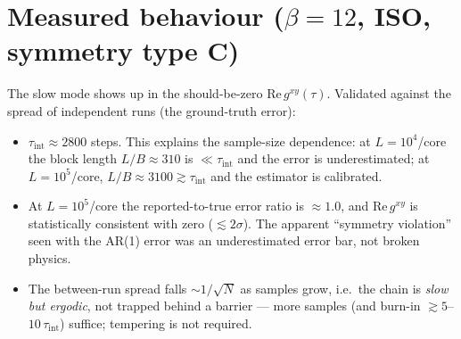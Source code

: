 \documentclass[11pt]{article}
\newcommand{\tauint}{\tau_{\mathrm{int}}}
\begin{document}
\section{Measured behaviour ($\beta=12$, ISO, symmetry type C)}
\label{sec:numbers}

The slow mode shows up in the should-be-zero $\mathrm{Re}\,g^{xy}(\tau)$. Validated
against the spread of independent runs (the ground-truth error):
\begin{itemize}
  \item $\tauint \approx 2800$ steps. This explains the sample-size dependence: at
        $L=10^4$/core the block length $L/B\approx310$ is $\ll\tauint$ and the error
        is underestimated; at $L=10^5$/core, $L/B\approx3100\gtrsim\tauint$ and the
        estimator is calibrated.
  \item At $L=10^5$/core the reported-to-true error ratio is $\approx 1.0$, and
        $\mathrm{Re}\,g^{xy}$ is statistically consistent with zero ($\lesssim 2\sigma$).
        The apparent ``symmetry violation'' seen with the AR(1) error was an
        underestimated error bar, not broken physics.
  \item The between-run spread falls $\sim 1/\sqrt N$ as samples grow, i.e.\ the chain
        is \emph{slow but ergodic}, not trapped behind a barrier --- more samples (and
        burn-in $\gtrsim5$--$10\,\tauint$) suffice; tempering is not required.
\end{itemize}
\end{document}
